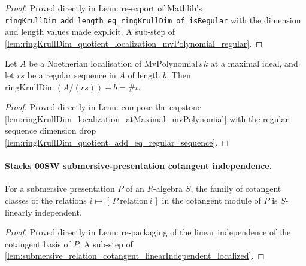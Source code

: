 \begin{proof}
  Proved directly in Lean: re-export of Mathlib's
  \texttt{ringKrullDim\_add\_length\_eq\_ringKrullDim\_of\_isRegular} with the
  dimension and length values made explicit. A sub-step of
  \cref{lem:ringKrullDim_quotient_localization_mvPolynomial_regular}.
\end{proof}

\begin{lemma}
  \label{lem:ringKrullDim_quotient_localization_mvPolynomial_regular}
  Let \(A\) be a Noetherian localisation of \(\mathrm{MvPolynomial}\,\iota\,k\) at a
  maximal ideal, and let \(rs\) be a regular sequence in \(A\) of length \(b\). Then
  \(\mathrm{ringKrullDim}\,(A/(rs)) + b = \#\iota\).
\end{lemma}

\begin{proof}
  Proved directly in Lean: compose the capstone
  \cref{lem:ringKrullDim_localization_atMaximal_mvPolynomial} with the
  regular-sequence dimension drop
  \cref{lem:ringKrullDim_quotient_add_eq_regular_sequence}.
\end{proof}

\paragraph{Stacks 00SW submersive-presentation cotangent independence.}

\begin{lemma}
  \label{lem:submersive_relation_cotangent_linearIndependent}
  For a submersive presentation \(P\) of an \(R\)-algebra \(S\), the family of
  cotangent classes of the relations \(i \mapsto [\,P.\mathrm{relation}\,i\,]\) in the
  cotangent module of \(P\) is \(S\)-linearly independent.
\end{lemma}

\begin{proof}
  Proved directly in Lean: re-packaging of the linear independence of the cotangent
  basis of \(P\). A sub-step of
  \cref{lem:submersive_relation_cotangent_linearIndependent_localized}.
\end{proof}

